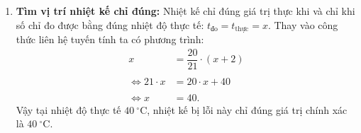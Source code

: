 \begin{vidumau}
{\begin{enumerate}
			\item \textbf{Tìm vị trí nhiệt kế chỉ đúng:}
			Nhiệt kế chỉ đúng giá trị thực khi và chỉ khi số chỉ đo được bằng đúng nhiệt độ thực tế: $t_{\mathrm{đo}} = t_{\mathrm{thực}} = x$.
			Thay vào công thức liên hệ tuyến tính ta có phương trình:
		\[
			\begin{aligned}
				x &= \dfrac{20}{21} \cdot (x + 2) \\\\
				\Leftrightarrow 21 \cdot x &= 20 \cdot x + 40 \\\\
				\Leftrightarrow x &= 40.
			\end{aligned}
		\]
			Vậy tại nhiệt độ thực tế $40\ ^\circ\mathrm{C}$, nhiệt kế bị lỗi này chỉ đúng giá trị chính xác là $40\ ^\circ\mathrm{C}$.
		\end{enumerate}
	}
\end{vidumau}
